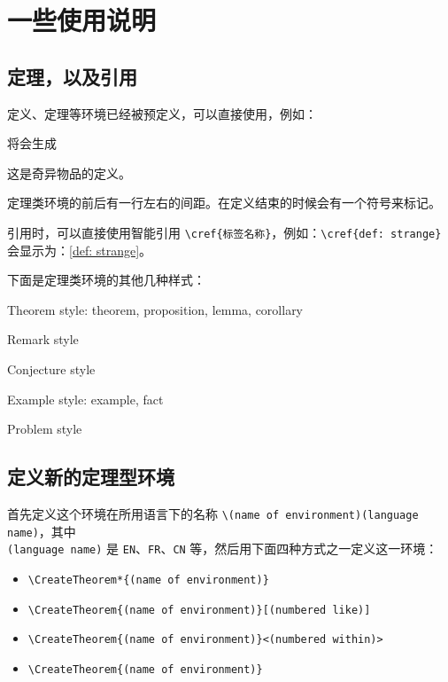 \documentclass{lebhart}
\begin{document}
\section{一些使用说明}

\subsection{定理，以及引用}

定义、定理等环境已经被预定义，可以直接使用，例如：


定理类环境的前后有一行左右的间距。在定义结束的时候会有一个符号来标记。

引用时，可以直接使用智能引用 \lstinline|\cref{标签名称}|，例如：\lstinline|\cref{def: strange}| 会显示为：\cref{def: strange}。

\bigskip
下面是定理类环境的其他几种样式：

\begin{theorem}
    Theorem style: theorem, proposition, lemma, corollary
\end{theorem}

\begin{remark}
    Remark style
\end{remark}

\begin{conjecture}
    Conjecture style
\end{conjecture}

\begin{example*}
    Example style: example, fact
\end{example*}

\begin{problem}
    Problem style
\end{problem}

\subsection{定义新的定理型环境}

首先定义这个环境在所用语言下的名称 \lstinline|\(name of environment)(language name)|，其中 \\\lstinline|(language name)| 是 \lstinline|EN|、\lstinline|FR|、\lstinline|CN| 等，然后用下面四种方式之一定义这一环境：
\begin{itemize}
    \item \lstinline|\CreateTheorem*{(name of environment)}|
    \item \lstinline|\CreateTheorem{(name of environment)}[(numbered like)]|
    \item \lstinline|\CreateTheorem{(name of environment)}<(numbered within)>|
    \item \lstinline|\CreateTheorem{(name of environment)}|
\end{itemize}
\end{document}
